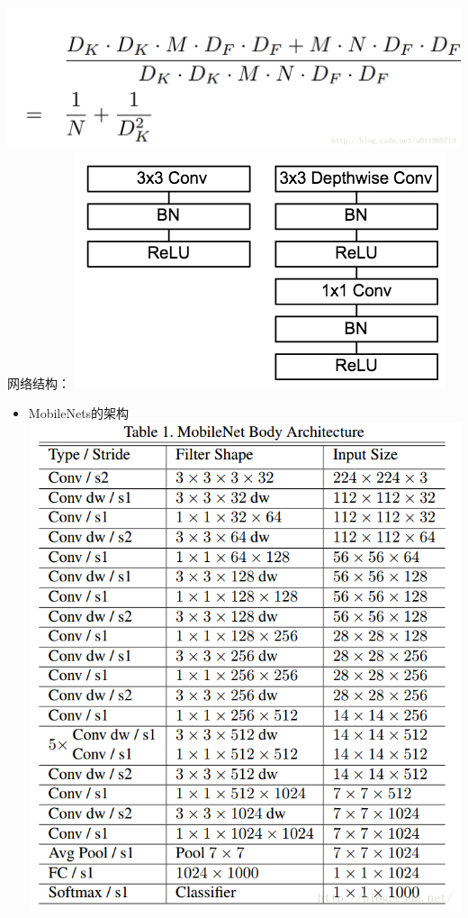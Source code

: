 \includegraphics{./img/ch17/13.png} 网络结构：
\includegraphics{./img/ch17/14.png}

\begin{itemize}
\item
  MobileNets的架构 \includegraphics{./img/ch17/15.png}
\end{itemize}

